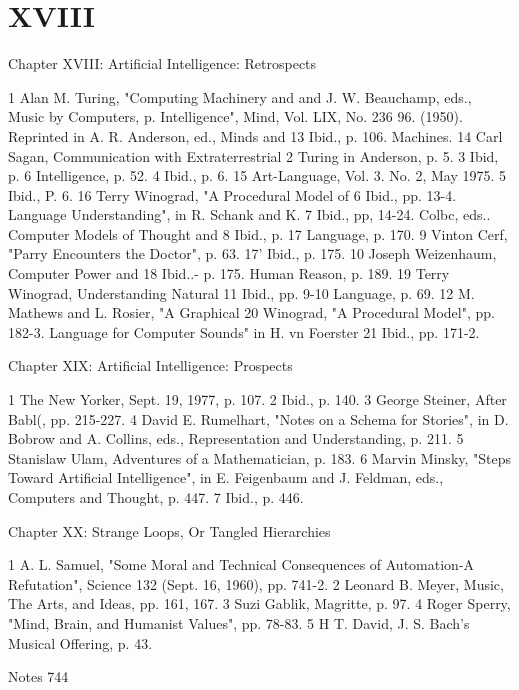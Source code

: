 \chapter{XVIII}

                          Chapter XVIII: Artificial Intelligence: Retrospects

1 Alan M. Turing, "Computing Machinery and             and J. W. Beauchamp, eds., Music by Computers, p.
Intelligence", Mind, Vol. LIX, No. 236                 96.
(1950). Reprinted in A. R. Anderson, ed., Minds and    13 Ibid., p. 106.
Machines.                                              14 Carl Sagan, Communication with Extraterrestrial
2 Turing in Anderson, p. 5. 3 Ibid, p. 6               Intelligence, p. 52.
4 Ibid., p. 6.                                         15 Art-Language, Vol. 3. No. 2, May 1975.
5 Ibid., P. 6.                                         16 Terry Winograd, "A Procedural Model of
6 Ibid., pp. 13-4.                                     Language Understanding", in R. Schank and K.
7 Ibid., pp, 14-24.                                    Colbc, eds.. Computer Models of Thought and
8 Ibid., p. 17                                         Language, p. 170.
9 Vinton Cerf, "Parry Encounters the Doctor", p. 63.   17' Ibid., p. 175.
10 Joseph Weizenhaum, Computer Power and               18 Ibid..- p. 175.
Human Reason, p. 189.                                  19 Terry Winograd, Understanding Natural
11 Ibid., pp. 9-10                                     Language, p. 69.
12 M. Mathews and L. Rosier, "A Graphical              20 Winograd, "A Procedural Model", pp. 182-3.
Language for Computer Sounds" in H. vn Foerster        21 Ibid., pp. 171-2.


                            Chapter XIX: Artificial Intelligence: Prospects

1 The New Yorker, Sept. 19, 1977, p. 107.
2 Ibid., p. 140.
3 George Steiner, After Babl(, pp. 215-227.
4 David E. Rumelhart, "Notes on a Schema for Stories", in D. Bobrow and A. Collins, eds., Representation
and Understanding, p. 211.
5 Stanislaw Ulam, Adventures of a Mathematician, p. 183.
6 Marvin Minsky, "Steps Toward Artificial Intelligence", in E. Feigenbaum and J. Feldman, eds.,
Computers and Thought, p. 447.
7 Ibid., p. 446.

                        Chapter XX: Strange Loops, Or Tangled Hierarchies

1 A. L. Samuel, "Some Moral and Technical Consequences of Automation-A Refutation", Science 132
(Sept. 16, 1960), pp. 741-2.
2 Leonard B. Meyer, Music, The Arts, and Ideas, pp. 161, 167.
3 Suzi Gablik, Magritte, p. 97.
4 Roger Sperry, "Mind, Brain, and Humanist Values", pp. 78-83.
5 H T. David, J. S. Bach's Musical Offering, p. 43.




Notes                                                                                               744

